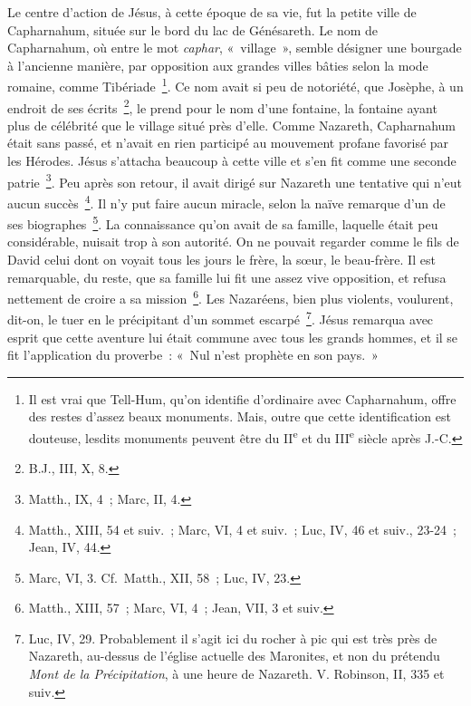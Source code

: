 \documentclass[french,twoside]{book} %
\begin{document}
Le centre d’action de Jésus, à cette époque de sa vie, fut la petite ville de Capharnahum, située sur le bord du lac de Génésareth. Le nom de Capharnahum, où entre le mot {\itshape caphar}, « village », semble désigner une bourgade à l’ancienne manière, par opposition aux grandes villes bâties selon la mode romaine, comme Tibériade \footnote{ Il est vrai que Tell-Hum, qu’on identifie d’ordinaire avec Capharnahum, offre des restes d’assez beaux monuments. Mais, outre que cette identification est douteuse, lesdits monuments peuvent être du II\textsuperscript{e} et du III\textsuperscript{e} siècle après J.-C.}. Ce nom avait si peu de notoriété, que Josèphe, à un endroit de ses écrits \footnote{ B.J., III, X, 8.}, le prend pour le nom d’une fontaine, la fontaine ayant plus de célébrité que le village situé près d’elle. Comme Nazareth, Capharnahum était sans passé, et n’avait en rien participé au mouvement profane favorisé par les Hérodes. Jésus s’attacha beaucoup à cette ville et s’en fit comme une seconde patrie \footnote{Matth., IX, 4 ; Marc, II, 4.}. Peu après son retour, il avait dirigé sur Nazareth une tentative qui n’eut aucun succès \footnote{Matth., XIII, 54 et suiv. ; Marc, VI, 4 et suiv. ; Luc, IV, 46 et suiv., 23-24 ; Jean, IV, 44.}. Il n’y put faire aucun miracle, selon la naïve remarque d’un de ses biographes \footnote{Marc, VI, 3. Cf. Matth., XII, 58 ; Luc, IV, 23.}. La connaissance qu’on avait de sa famille, laquelle était peu considérable, nuisait trop à son autorité. On ne pouvait regarder comme le fils de David celui dont on voyait tous les jours le frère, la sœur, le beau-frère. Il est remarquable, du reste, que sa famille lui fit une assez vive opposition, et refusa nettement de croire a sa mission \footnote{Matth., XIII, 57 ; Marc, VI, 4 ; Jean, VII, 3 et suiv.}. Les Nazaréens, bien plus violents, voulurent, dit-on, le tuer en le précipitant d’un sommet escarpé \footnote{ Luc, IV, 29. Probablement il s’agit ici du rocher à pic qui est très près de Nazareth, au-dessus de l’église actuelle des Maronites, et non du prétendu {\itshape Mont de la Précipitation}, à une heure de Nazareth. V. Robinson, II, 335 et suiv.}. Jésus remarqua avec esprit que cette aventure lui était commune avec tous les grands hommes, et il se fit l’application du proverbe : « Nul n’est prophète en son pays. »\par
\end{document}
